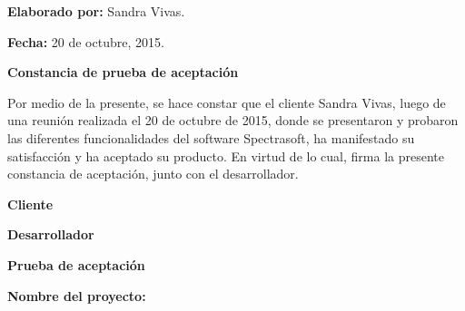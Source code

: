 \begin{minipage}[t]{0.45\textwidth}
	\begin{flushleft}
		\textbf{Elaborado por:} Sandra Vivas.
	\end{flushleft}
\end{minipage}
\begin{minipage}[t]{0.45\textwidth}
	\begin{flushright}
		\begin{center}
			\textbf{Fecha:} 20 de octubre, 2015.
		\end{center}
	\end{flushright}
\end{minipage}
\vfill

\newpage
\begin{center}
	\textbf{Constancia de prueba de aceptaci\'{o}n}
\end{center}

Por medio de la presente, se hace constar que el cliente Sandra Vivas, luego de una reuni\'{o}n realizada el 20 de octubre de 2015, donde se presentaron y probaron las diferentes funcionalidades del software Spectrasoft, ha manifestado su satisfacci\'{o}n y ha aceptado su producto. En virtud de lo cual, firma la presente constancia de aceptaci\'{o}n, junto con el desarrollador.

\null
\null
\null

\begin{minipage}[t]{0.45\textwidth}
	\begin{flushleft}
		\begin{center}
			\textbf{Cliente}
		\end{center}
	\end{flushleft}
\end{minipage}
\begin{minipage}[t]{0.45\textwidth}
	\begin{flushright}
		\begin{center}
			\textbf{Desarrollador}
		\end{center}
	\end{flushright}
\end{minipage}
\newpage
\begin{center}
	\textbf{Prueba de aceptaci\'{o}n}
\end{center}

\textbf{Nombre del proyecto:} \proyecto

